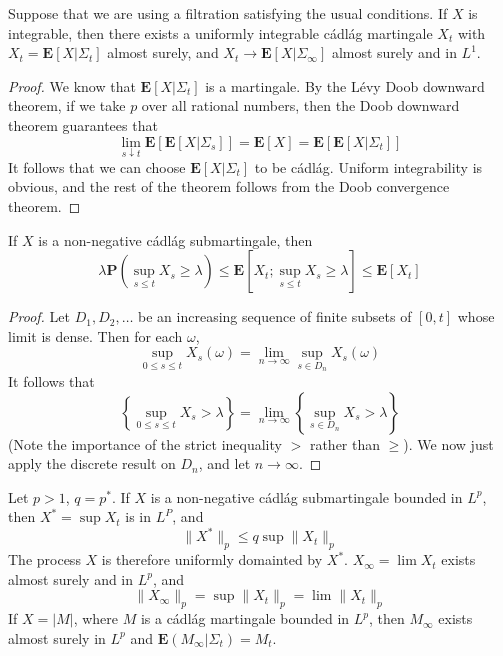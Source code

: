 \begin{theorem}
    Suppose that we are using a filtration satisfying the usual conditions. If $X$ is integrable, then there exists a uniformly integrable c\'{a}dl\'{a}g martingale $X_t$ with $X_t = \mathbf{E}[X|\Sigma_t]$ almost surely, and $X_t \to \mathbf{E}[X|\Sigma_\infty]$ almost surely and in $L^1$.
\end{theorem}
\begin{proof}
    We know that $\mathbf{E}[X|\Sigma_t]$ is a martingale. By the L\'{e}vy Doob downward theorem, if we take $p$ over all rational numbers, then the Doob downward theorem guarantees that
    \[ \lim_{s \downarrow t} \mathbf{E}[\mathbf{E}[X|\Sigma_s]] = \mathbf{E}[X] = \mathbf{E}[\mathbf{E}[X|\Sigma_t]] \]
    It follows that we can choose $\mathbf{E}[X|\Sigma_t]$ to be c\'{a}dl\'{a}g. Uniform integrability is obvious, and the rest of the theorem follows from the Doob convergence theorem.
\end{proof}

\begin{theorem}
    If $X$ is a non-negative c\'{a}dl\'{a}g submartingale, then
    \[ \lambda \mathbf{P}( \sup_{s \leq t} X_s \geq \lambda) \leq \mathbf{E} \left[X_t; \sup_{s \leq t} X_s \geq \lambda \right] \leq \mathbf{E}[X_t] \]
\end{theorem}
\begin{proof}
    Let $D_1, D_2, \dots$ be an increasing sequence of finite subsets of $[0,t]$ whose limit is dense. Then for each $\omega$,
    \[ \sup_{0 \leq s \leq t} X_s(\omega) = \lim_{n \to \infty} \sup_{s \in D_n} X_s(\omega) \]
    It follows that
    \[ \left\{ \sup_{0 \leq s \leq t} X_s > \lambda \right\} = \lim_{n \to \infty} \left\{ \sup_{s \in D_n} X_s > \lambda \right\} \]
    (Note the importance of the strict inequality $>$ rather than $\geq$). We now just apply the discrete result on $D_n$, and let $n \to \infty$.
\end{proof}

\begin{theorem}
    Let $p > 1$, $q = p^*$. If $X$ is a non-negative c\'{a}dl\'{a}g submartingale bounded in $L^p$, then $X^* = \sup X_t$ is in $L^P$, and
    \[ \| X^* \|_p \leq q \sup \| X_t \|_p \]
    The process $X$ is therefore uniformly domainted by $X^*$. $X_\infty = \lim X_t$ exists almost surely and in $L^p$, and
    \[ \|X_\infty \|_p = \sup \|X_t \|_p = \lim \| X_t \|_p \]
    If $X = |M|$, where $M$ is a c\'{a}dl\'{a}g martingale bounded in $L^p$, then $M_\infty$ exists almost surely in $L^p$ and $\mathbf{E}(M_\infty|\Sigma_t) = M_t$.
\end{theorem}

